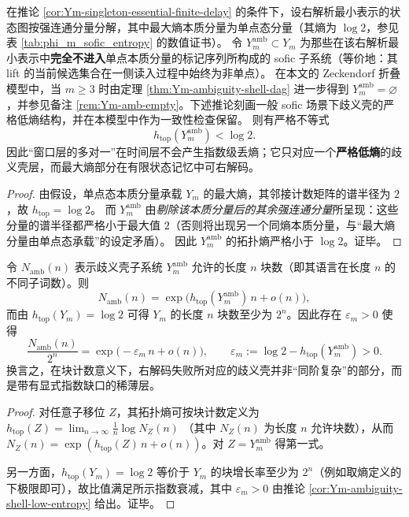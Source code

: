 \begin{corollary}\label{cor:Ym-ambiguity-shell-low-entropy}
在推论 \ref{cor:Ym-singleton-essential-finite-delay} 的条件下，设右解析最小表示的状态图按强连通分量分解，其中最大熵本质分量为单点态分量（其熵为 \(\log 2\)，参见表 \ref{tab:phi_m_sofic_entropy} 的数值证书）。
令 \(Y_m^{\mathrm{amb}}\subset Y_m\) 为那些在该右解析最小表示中\textbf{完全不进入}单点本质分量的标记序列所构成的 sofic 子系统（等价地：其 lift 的当前候选集合在一侧读入过程中始终为非单点）。
在本文的 Zeckendorf 折叠模型中，当 \(m\ge 3\) 时由定理 \ref{thm:Ym-ambiguity-shell-dag} 进一步得到 \(Y_m^{\mathrm{amb}}=\varnothing\)，并参见备注 \ref{rem:Ym-amb-empty}。下述推论刻画一般 sofic 场景下歧义壳的严格低熵结构，并在本模型中作为一致性检查保留。
则有严格不等式
\[
h_{\mathrm{top}}(Y_m^{\mathrm{amb}})<\log 2.
\]
因此“窗口层的多对一”在时间层不会产生指数级丢熵；它只对应一个\textbf{严格低熵}的歧义壳层，而最大熵部分在有限状态记忆中可右解码。
\end{corollary}
\begin{proof}
由假设，单点态本质分量承载 \(Y_m\) 的最大熵，其邻接计数矩阵的谱半径为 \(2\)，故 \(h_{\mathrm{top}}=\log 2\)。
而 \(Y_m^{\mathrm{amb}}\) 由\emph{剔除该本质分量后的其余强连通分量}所呈现：这些分量的谱半径都严格小于最大值 \(2\)（否则将出现另一个同熵本质分量，与“最大熵分量由单点态承载”的设定矛盾）。
因此 \(Y_m^{\mathrm{amb}}\) 的拓扑熵严格小于 \(\log 2\)。证毕。
\end{proof}

\begin{corollary}\label{cor:Ym-ambiguity-shell-exponentially-thin}
令 \(N_{\mathrm{amb}}(n)\) 表示歧义壳子系统 \(Y_m^{\mathrm{amb}}\) 允许的长度 \(n\) 块数（即其语言在长度 \(n\) 的不同子词数）。则
\[
N_{\mathrm{amb}}(n)=\exp\!\bigl(h_{\mathrm{top}}(Y_m^{\mathrm{amb}})\,n+o(n)\bigr),
\]
而由 \(h_{\mathrm{top}}(Y_m)=\log 2\) 可得 \(Y_m\) 的长度 \(n\) 块数至少为 \(2^n\)。因此存在 \(\varepsilon_m>0\) 使得
\[
\frac{N_{\mathrm{amb}}(n)}{2^n}
=
\exp\!\bigl(-\varepsilon_m\,n+o(n)\bigr),
\qquad
\varepsilon_m:=\log 2-h_{\mathrm{top}}(Y_m^{\mathrm{amb}})>0.
\]
换言之，在块计数意义下，右解码失败所对应的歧义壳并非“同阶复杂”的部分，而是带有显式指数缺口的稀薄层。
\end{corollary}

\begin{proof}
对任意子移位 \(Z\)，其拓扑熵可按块计数定义为
\(
h_{\mathrm{top}}(Z)=\lim_{n\to\infty}\frac{1}{n}\log N_Z(n)
\)
（其中 \(N_Z(n)\) 为长度 \(n\) 允许块数），从而 \(N_Z(n)=\exp(h_{\mathrm{top}}(Z)\,n+o(n))\)。对 \(Z=Y_m^{\mathrm{amb}}\) 得第一式。
\par
另一方面，\(h_{\mathrm{top}}(Y_m)=\log 2\) 等价于 \(Y_m\) 的块增长率至少为 \(2^n\)（例如取熵定义的下极限即可），故比值满足所示指数衰减，其中 \(\varepsilon_m>0\) 由推论 \ref{cor:Ym-ambiguity-shell-low-entropy} 给出。证毕。
\end{proof}


